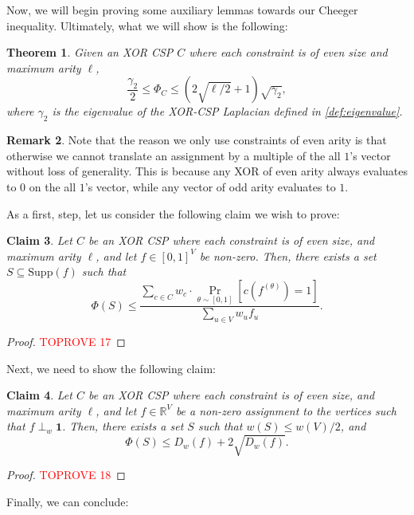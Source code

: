 \documentclass[11pt]{article}
\newtheorem{theorem}{Theorem}[section]
\newtheorem{claim}[theorem]{Claim}
\theoremstyle{definition}
\newtheorem{remark}[theorem]{Remark}
\newcommand{\R}{\mathbb{R}}
\newcommand{\Supp}{\mathrm{Supp}}
\begin{document}
Now, we will begin proving some auxiliary lemmas towards our Cheeger inequality. Ultimately, what we will show is the following:

\begin{theorem}
    Given an XOR CSP $C$ where each constraint is of even size and maximum arity $\ell$,
    \[
    \frac{\gamma_2}{2} \leq \Phi_C \leq \left (2 \sqrt{\ell/2} + 1 \right) \sqrt{\gamma_2},
    \]
    where $\gamma_2$ is the eigenvalue of the XOR-CSP Laplacian defined in \cref{def:eigenvalue}. 
\end{theorem}

\begin{remark}
    Note that the reason we only use constraints of even arity is that otherwise we cannot translate an assignment by a multiple of the all $1$'s vector without loss of generality. This is because any XOR of even arity always evaluates to $0$ on the all $1$'s vector, while any vector of odd arity evaluates to $1$.
\end{remark}

As a first, step, let us consider the following claim we wish to prove: 

\begin{claim}\label{clm:rounding}
    Let $C$ be an XOR CSP where each constraint is of even size, and maximum arity $\ell$, and let $f \in [0,1]^V$ be non-zero. Then, there exists a set $S \subseteq \Supp(f)$ such that 
    \[
    \Phi(S) \leq \frac{\sum_{c \in C} w_c \cdot \Pr_{\theta \sim [0,1]}[c(f^{(\theta)}) = 1]}{\sum_{u \in V} w_u f_u}.
    \]
\end{claim}

\begin{proof}\textcolor{red}{TOPROVE 17}\end{proof}

Next, we need to show the following claim: 

\begin{claim}\label{clm:upperBound}
    Let $C$ be an XOR CSP where each constraint is of even size, and maximum arity $\ell$, and let $f \in \R^V$ be a non-zero assignment to the vertices such that $f \perp_w \mathbf{1}$. Then, there exists a set $S$ such that $w(S) \leq w(V) / 2$, and 
    \[
    \Phi(S) \leq D_w(f) + 2 \sqrt{D_w(f)}.
    \]
\end{claim}

\begin{proof}\textcolor{red}{TOPROVE 18}\end{proof}

Finally, we can conclude:
\end{document}
